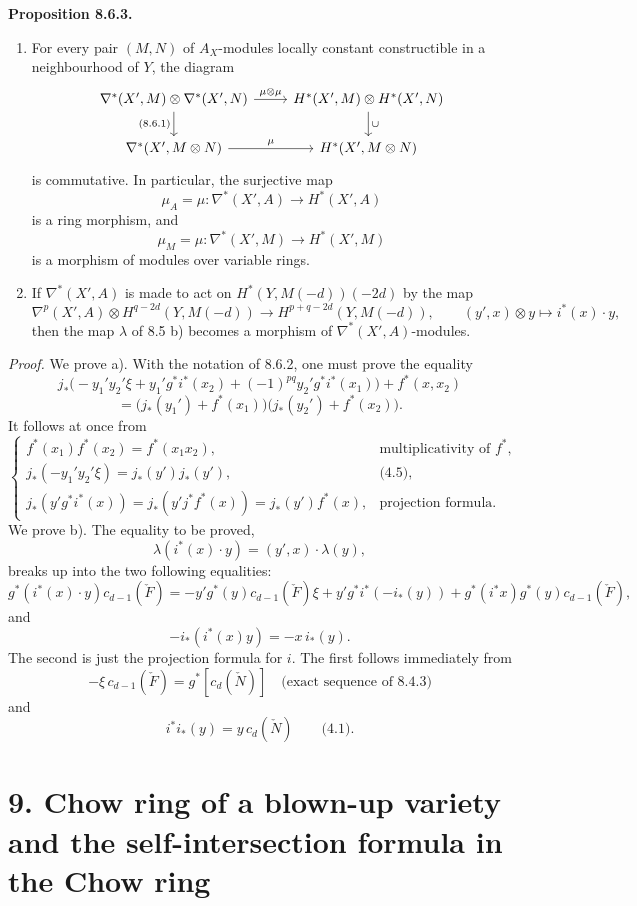 \documentclass[11pt]{article}
\newenvironment{statement}[1]{\par\medskip\noindent\textbf{#1.}\ }{\par\medskip}
\begin{document}
\begin{statement}{Proposition 8.6.3}
\begin{enumerate}[label=\alph*)]
\item For every pair $(M,N)$ of $A_X$-modules locally constant constructible in a neighbourhood of $Y$, the diagram
\[
\begin{tikzcd}
\nabla^*(X',M)\otimes\nabla^*(X',N)\arrow[r,"\mu\otimes\mu"]\arrow[d,"{(8.6.1)}"']&
H^*(X',M)\otimes H^*(X',N)\arrow[d,"\cup"]\\
\nabla^*(X',M\otimes N)\arrow[r,"\mu"]&
H^*(X',M\otimes N)
\end{tikzcd}
\]
is commutative. In particular, the surjective map
\[
\mu_A=\mu:\nabla^*(X',A)\to H^*(X',A)
\]
is a ring morphism, and
\[
\mu_M=\mu:\nabla^*(X',M)\to H^*(X',M)
\]
is a morphism of modules over variable rings.
\item If $\nabla^*(X',A)$ is made to act on $H^*(Y,M(-d))(-2d)$ by the map
\[
\nabla^p(X',A)\otimes H^{q-2d}(Y,M(-d))
\to H^{p+q-2d}(Y,M(-d)),
\qquad
(y',x)\otimes y\mapsto i^*(x)\cdot y,
\]
then the map $\lambda$ of 8.5 b) becomes a morphism of $\nabla^*(X',A)$-modules.
\end{enumerate}
\end{statement}

\emph{Proof.} We prove a). With the notation of 8.6.2, one must prove the equality
\[
j_*\bigl(-y_1'y_2'\xi+y_1'g^*i^*(x_2)+(-1)^{pq}y_2'g^*i^*(x_1)\bigr)+f^*(x,x_2)
\]
\[
=\bigl(j_*(y_1')+f^*(x_1)\bigr)\bigl(j_*(y_2')+f^*(x_2)\bigr).
\]
It follows at once from
\[
\begin{cases}
f^*(x_1)f^*(x_2)=f^*(x_1x_2),&\text{multiplicativity of }f^*,\\
j_*(-y_1'y_2'\xi)=j_*(y')j_*(y'),&\text{(4.5)},\\
j_*(y'g^*i^*(x))=j_*(y'j^*f^*(x))=j_*(y')f^*(x),&\text{projection formula}.
\end{cases}
\]
We prove b). The equality to be proved,
\[
\lambda(i^*(x)\cdot y)=(y',x)\cdot\lambda(y),
\]
breaks up into the two following equalities:
\[
g^*(i^*(x)\cdot y)c_{d-1}(\check F)
=
-y'g^*(y)c_{d-1}(\check F)\xi
+y'g^*i^*(-i_*(y))
+g^*(i^*x)g^*(y)c_{d-1}(\check F),
\]
and
\[
-i_*(i^*(x)y)=-x\,i_*(y).
\]
The second is just the projection formula for $i$. The first follows immediately from
\[
-\xi\,c_{d-1}(\check F)=g^*[c_d(\check N)]
\quad\text{(exact sequence of 8.4.3)}
\]
and
\[
i^*i_*(y)=y\,c_d(\check N)\qquad\text{(4.1)}.
\]

\section*{9. Chow ring of a blown-up variety and the self-intersection formula in the Chow ring}
\end{document}
